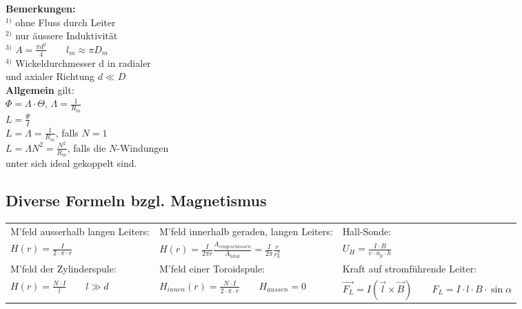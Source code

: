 \begin{multicols}{2}
	\textbf{Bemerkungen:}\\
	$^{1)}$ ohne Fluss durch Leiter\\
	$^{2)}$ nur äussere Induktivität\\
	$^{3)}$ $A=\frac{\pi d^2}{4} \qquad l_m \approx \pi D_m$\\
	$^{4)}$ Wickeldurchmesser d in radialer\\ und axialer Richtung $d \ll D$\\
	
	\textbf{Allgemein} gilt:\\
	$\Phi=\Lambda \cdot \Theta$, $\Lambda=\frac{1}{R_m}$\\
	$L=\frac{\Psi}{I}$\\
	$L=\Lambda=\frac{1}{R_m}$, falls $N=1$\\
	$L=\Lambda N^2=\frac{N^2}{R_m}$, falls die $N$-Windungen\\ unter sich ideal
	gekoppelt sind.
\end{multicols}

\subsection{Diverse Formeln bzgl. Magnetismus}
\renewcommand{\arraystretch}{1.1}
\begin{tabular}[c]{|l|l|l|}
\hline
M'feld ausserhalb langen Leiters:
	& M'feld innerhalb geraden, langen Leiters: 
	& Hall-Sonde:\\
$H(r) = \frac{I}{2 \cdot \pi \cdot r}$
	&$H(r) = \frac{I}{2 \pi r} \frac{A_{eingeschlossen}}{A_{total}} = 
	 \frac{I}{2 \pi} \frac{r}{r_a^2}$
	& $U_H = \frac{I \cdot B}{e \cdot n_p \cdot h}$\\
\hline
M'feld der Zylinderspule:
	&M'feld einer Toroidspule:
	&Kraft auf stromführende Leiter:\\
$H(r) = \frac{N \cdot I}{l} \qquad l \gg d$
	& $H_{innen}(r) = \frac{N \cdot I}{2 \cdot \pi \cdot r} \qquad H_{aussen} = 0$
	&$\vec{F_L} = I (\vec{l} \times \vec{B}) \qquad F_L = I \cdot l \cdot B \cdot
	\sin{\alpha}$ \\
\hline
\end{tabular}
\renewcommand{\arraystretch}{1}

